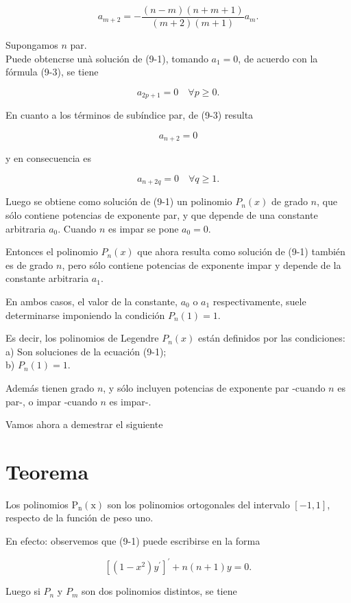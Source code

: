 \documentclass[10pt]{article}
\theoremstyle{plain}
\theoremstyle{definition}
\theoremstyle{remark}
\begin{document}
\begin{equation*}
a_{m+2}=-\frac{(n-m)(n+m+1)}{(m+2)(m+1)} a_{m} . \tag{9-3}
\end{equation*}


Supongamos $n$ par.\\
Puede obtencrse unà solución de (9-1), tomando $a_{1}=0$, de acuerdo con la fórmula (9-3), se tiene

$$
a_{2 p+1}=0 \quad \forall p \geqslant 0 .
$$

En cuanto a los términos de subíndice par, de (9-3) resulta

$$
a_{n+2}=0
$$

y en consecuencia es

$$
a_{n+2 q}=0 \quad \forall q \geqslant 1 .
$$

Luego se obtiene como solución de (9-1) un polinomio $P_{n}(x)$ de grado $n$, que sólo contiene potencias de exponente par, y que dẹpende de una constante arbitraria $a_{0}$. Cuando $n$ es impar se pone $a_{0}=0$.

Entonces el polinomio $P_{n}(x)$ que ahora resulta como solución de (9-1) también es de grado $n$, pero sólo contiene potencias de exponente impar y depende de la constante arbitraria $a_{1}$.

En ambos casos, el valor de la constante, $a_{0}$ o $a_{1}$ respectivamente, suele determinarse imponiendo la condición $P_{n}(1)=1$.

Es decir, los polinomios de Legendre $P_{n}(x)$ están definidos por las condiciones:\\
a) Son soluciones de la ecuación (9-1);\\
b) $P_{n}(1)=1$.

Además tienen grado $n$, y sólo incluyen potencias de exponente par -cuando $n$ es par-, o impar -cuando $n$ es impar-.

Vamos ahora a demestrar el siguiente

\section*{Teorema}
Los polinomios $\mathrm{P}_{\mathrm{n}}(\mathrm{x})$ son los polinomios ortogonales del intervalo $[-1,1]$, respecto de la función de peso uno.

En efecto: observemos que (9-1) puede escribirse en la forma

$$
\left[\left(1-x^{2}\right) y^{\prime}\right]^{\prime}+n(n+1) y=0 .
$$

Luego si $P_{n}$ y $P_{m}$ son dos polinomios distintos, se tiene
\end{document}
